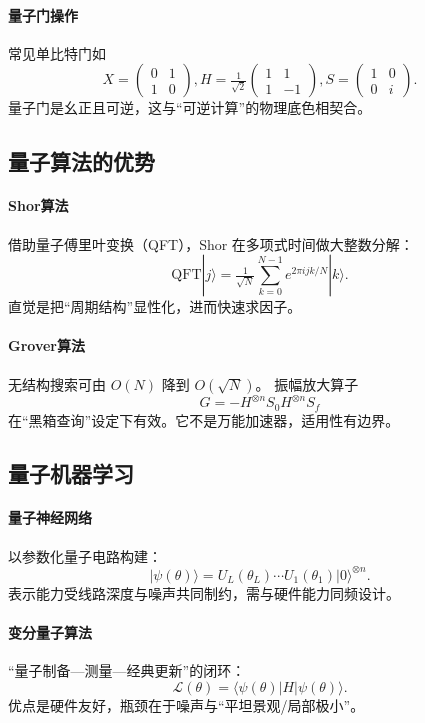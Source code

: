 \paragraph{量子门操作}
常见单比特门如
$$X=\begin{pmatrix}0&1\\1&0\end{pmatrix},
H=\tfrac{1}{\sqrt{2}}\begin{pmatrix}1&1\\1&-1\end{pmatrix},
S=\begin{pmatrix}1&0\\0&i\end{pmatrix}.$$
量子门是幺正且可逆，这与“可逆计算”的物理底色相契合。

\subsection{量子算法的优势}

\paragraph{Shor算法}
借助量子傅里叶变换（QFT），Shor 在多项式时间做大整数分解：
$$\mathrm{QFT}|j\rangle=\tfrac{1}{\sqrt{N}}\sum_{k=0}^{N-1}e^{2\pi ijk/N}|k\rangle.$$
直觉是把“周期结构”显性化，进而快速求因子。

\paragraph{Grover算法}
无结构搜索可由 $O(N)$ 降到 $O(\sqrt{N})$。  
振幅放大算子
$$G=-H^{\otimes n}S_0H^{\otimes n}S_f$$
在“黑箱查询”设定下有效。它不是万能加速器，适用性有边界。

\subsection{量子机器学习}

\paragraph{量子神经网络}
以参数化量子电路构建：
$$|\psi(\theta)\rangle=U_L(\theta_L)\cdots U_1(\theta_1)|0\rangle^{\otimes n}.$$
表示能力受线路深度与噪声共同制约，需与硬件能力同频设计。

\paragraph{变分量子算法}
“量子制备—测量—经典更新”的闭环：
$$\mathcal{L}(\theta)=\langle\psi(\theta)|H|\psi(\theta)\rangle.$$
优点是硬件友好，瓶颈在于噪声与“平坦景观/局部极小”。

